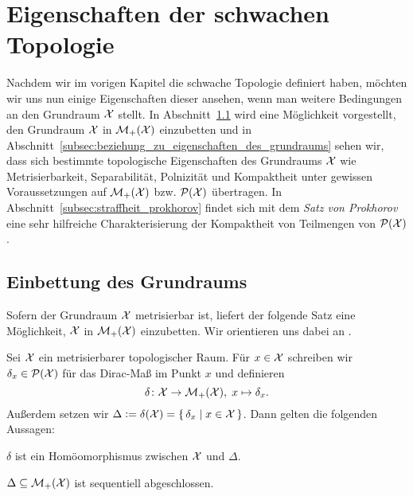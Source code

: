 \documentclass[../thesis/thesis.tex]{subfiles}
\begin{document}
	
	\chapter{Eigenschaften der schwachen Topologie}
	\label{chap:eigenschaften_der_schwachen_topologie}
	
	Nachdem wir im vorigen Kapitel die schwache Topologie definiert haben, möchten wir uns nun einige Eigenschaften dieser ansehen, wenn man weitere Bedingungen an den Grundraum $\mathcal{X}$ stellt. 
	In Abschnitt~\ref{subsec:einbettung_des_grundraums} wird eine Möglichkeit vorgestellt, den Grundraum $\mathcal{X}$ in $\mathcal{M}_{+}(\mathcal{X})$ einzubetten und in Abschnitt~\ref{subsec:beziehung_zu_eigenschaften_des_grundraums} sehen wir, dass sich bestimmte topologische Eigenschaften des Grundraums $\mathcal{X}$ wie 
	Metrisierbarkeit, Separabilität, Polnizität und Kompaktheit unter gewissen Voraussetzungen auf $\mathcal{M}_{+}(\mathcal{X})$ bzw. $\mathcal{P}(\mathcal{X})$ übertragen.
	In Abschnitt~\ref{subsec:straffheit_prokhorov} findet sich mit dem \emph{Satz von Prokhorov} eine sehr hilfreiche Charakterisierung der Kompaktheit von Teilmengen von $\mathcal{P}(\mathcal{X})$.
	
	\section{Einbettung des Grundraums}
	\label{subsec:einbettung_des_grundraums}
	
	Sofern der Grundraum $\mathcal{X}$ metrisierbar ist, liefert der folgende Satz eine Möglichkeit, $\mathcal{X}$ in $\mathcal{M}_{+}(\mathcal{X})$ einzubetten. 
	Wir orientieren uns dabei an \cite[Hilfssätze 3.2 und 3.3]{Varadarajan.1958}.
	
	\begin{Satz}
		\label{satz:einbettung_des_grundraums}
		Sei $\mathcal{X}$ ein metrisierbarer topologischer Raum. Für $x \in \mathcal{X}$ schreiben wir $\delta_x \in \mathcal{P}(\mathcal{X})$ für das Dirac-Maß im Punkt $x$ und definieren
		\[ \delta \colon \mathcal{X} \to \mathcal{M}_{+}(\mathcal{X}), \; x \mapsto \delta_x  \text{.} \]
		Außerdem setzen wir $\Delta \vcentcolon = \delta(\mathcal{X}) = \left\{\, \delta_x \; \middle| \; x \in \mathcal{X} \,\right\}$. Dann gelten die folgenden Aussagen:
		\begin{enumeratethm}
			\item $\delta$ ist ein Homöomorphismus zwischen $\mathcal{X}$ und $\Delta$.
			\item $\Delta \subseteq \mathcal{M}_{+}(\mathcal{X})$ ist sequentiell abgeschlossen.
		\end{enumeratethm}
	\end{Satz}
\end{document}
